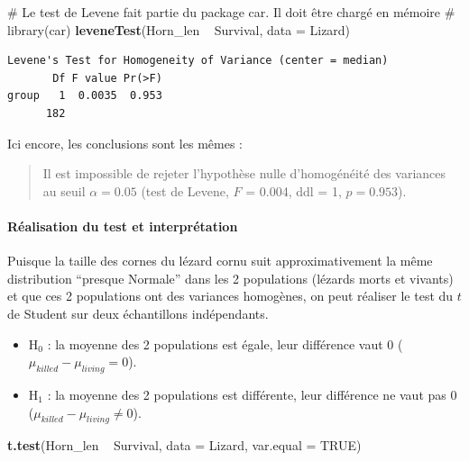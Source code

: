 \documentclass[a4paperpaper,]{article}
\newenvironment{Shaded}{\begin{snugshade}}{\end{snugshade}}
\newcommand{\CommentTok}[1]{\textcolor[rgb]{0.54,0.53,0.53}{#1}}
\newcommand{\DataTypeTok}[1]{\textcolor[rgb]{0.00,0.34,0.68}{#1}}
\newcommand{\KeywordTok}[1]{\textcolor[rgb]{0.12,0.11,0.11}{\textbf{#1}}}
\newcommand{\NormalTok}[1]{\textcolor[rgb]{0.12,0.11,0.11}{#1}}
\newcommand{\OperatorTok}[1]{\textcolor[rgb]{0.12,0.11,0.11}{#1}}
\newcommand{\OtherTok}[1]{\textcolor[rgb]{0.00,0.43,0.16}{#1}}
\newcommand{\StringTok}[1]{\textcolor[rgb]{0.75,0.01,0.01}{#1}}
\providecommand{\tightlist}{%
  \setlength{\itemsep}{0pt}\setlength{\parskip}{0pt}}
\let\oldparagraph\paragraph
\renewcommand{\paragraph}[1]{\oldparagraph{#1}\mbox{}}
\begin{document}
\begin{Shaded}
\begin{Highlighting}[]
\CommentTok{# Le test de Levene fait partie du package car. Il doit être chargé en mémoire}
\CommentTok{# library(car)}
\KeywordTok{leveneTest}\NormalTok{(Horn_len }\OperatorTok{~}\StringTok{ }\NormalTok{Survival, }\DataTypeTok{data =}\NormalTok{ Lizard)}
\end{Highlighting}
\end{Shaded}

\begin{verbatim}
Levene's Test for Homogeneity of Variance (center = median)
       Df F value Pr(>F)
group   1  0.0035  0.953
      182               
\end{verbatim}

Ici encore, les conclusions sont les mêmes :

\begin{quote}
Il est impossible de rejeter l'hypothèse nulle d'homogénéité des variances au seuil \(\alpha = 0.05\) (test de Levene, \(F\) = 0.004, ddl = 1, \(p = 0.953\)).
\end{quote}

\hypertarget{ruxe9alisation-du-test-et-interpruxe9tation-2}{%
\paragraph{Réalisation du test et interprétation}\label{ruxe9alisation-du-test-et-interpruxe9tation-2}}

Puisque la taille des cornes du lézard cornu suit approximativement la même distribution ``presque Normale'' dans les 2 populations (lézards morts et vivants) et que ces 2 populations ont des variances homogènes, on peut réaliser le test du \(t\) de Student sur deux échantillons indépendants.

\begin{itemize}
\tightlist
\item
  H\(_0\) : la moyenne des 2 populations est égale, leur différence vaut 0 (\(\mu_{killed}-\mu_{living} = 0\)).
\item
  H\(_1\) : la moyenne des 2 populations est différente, leur différence ne vaut pas 0 (\(\mu_{killed}-\mu_{living} \neq 0\)).
\end{itemize}

\begin{Shaded}
\begin{Highlighting}[]
\KeywordTok{t.test}\NormalTok{(Horn_len }\OperatorTok{~}\StringTok{ }\NormalTok{Survival, }\DataTypeTok{data =}\NormalTok{ Lizard, }\DataTypeTok{var.equal =} \OtherTok{TRUE}\NormalTok{)}
\end{Highlighting}
\end{Shaded}
\end{document}
